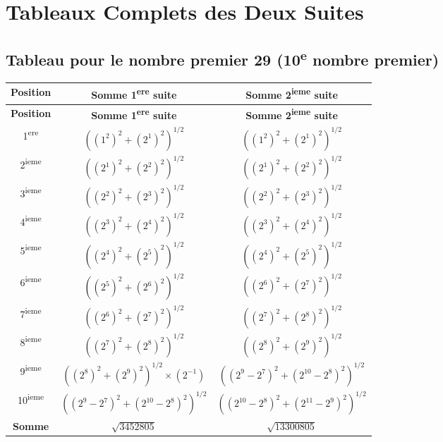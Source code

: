 \documentclass[a4paper,11pt]{article}
\begin{document}
\newpage
\section{Tableaux Complets des Deux Suites}

\subsection{Tableau pour le nombre premier 29 (10\textsuperscript{e} nombre premier)}

\begin{center}
\begin{longtable}{|c|c|c|}
\hline
\textbf{Position} & \textbf{Somme 1\textsuperscript{ere} suite} & \textbf{Somme 2\textsuperscript{ieme} suite} \\
\hline
\endfirsthead
\hline
\textbf{Position} & \textbf{Somme 1\textsuperscript{ere} suite} & \textbf{Somme 2\textsuperscript{ieme} suite} \\
\hline
\endhead
1\textsuperscript{ere} & $((1^2)^2 + (2^1)^2)^{1/2}$ & $((1^2)^2 + (2^1)^2)^{1/2}$ \\
\hline
2\textsuperscript{ieme} & $((2^1)^2 + (2^2)^2)^{1/2}$ & $((2^1)^2 + (2^2)^2)^{1/2}$ \\
\hline
3\textsuperscript{ieme} & $((2^2)^2 + (2^3)^2)^{1/2}$ & $((2^2)^2 + (2^3)^2)^{1/2}$ \\
\hline
4\textsuperscript{ieme} & $((2^3)^2 + (2^4)^2)^{1/2}$ & $((2^3)^2 + (2^4)^2)^{1/2}$ \\
\hline
5\textsuperscript{ieme} & $((2^4)^2 + (2^5)^2)^{1/2}$ & $((2^4)^2 + (2^5)^2)^{1/2}$ \\
\hline
6\textsuperscript{ieme} & $((2^5)^2 + (2^6)^2)^{1/2}$ & $((2^6)^2 + (2^7)^2)^{1/2}$ \\
\hline
7\textsuperscript{ieme} & $((2^6)^2 + (2^7)^2)^{1/2}$ & $((2^7)^2 + (2^8)^2)^{1/2}$ \\
\hline
8\textsuperscript{ieme} & $((2^7)^2 + (2^8)^2)^{1/2}$ & $((2^8)^2 + (2^9)^2)^{1/2}$ \\
\hline
9\textsuperscript{ieme} & $((2^8)^2 + (2^9)^2)^{1/2} \times (2^{-1})$ & $((2^9-2^7)^2 + (2^{10}-2^8)^2)^{1/2}$ \\
\hline
10\textsuperscript{ieme} & $((2^9-2^7)^2 + (2^{10}-2^8)^2)^{1/2}$ & $((2^{10}-2^8)^2 + (2^{11}-2^9)^2)^{1/2}$ \\
\hline
\textbf{Somme} & $\sqrt{3452805}$ & $\sqrt{13300805}$ \\
\hline
\end{longtable}
\end{center}
\end{document}
